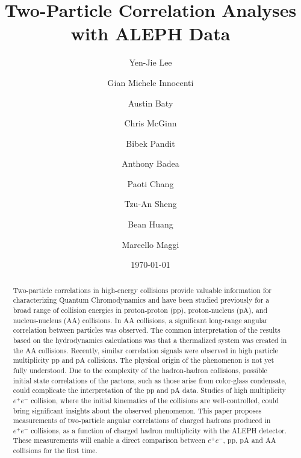 \documentclass[aps,prl,twocolumn,showpacs,superscriptaddress,groupedaddress]{revtex4}  %
\begin{document}
\widetext
{}

\title{Two-Particle Correlation Analyses with ALEPH Data}
\author{Yen-Jie Lee}
\author{Gian Michele Innocenti}
\author{Austin Baty}
\author{Chris McGinn}
\author{Bibek Pandit}
\author{Anthony Badea}
%
\author{Paoti Chang}
\author{Tzu-An Sheng}
\author{Bean Huang}
%
\author{Marcello Maggi}
%
\date{\today}


\begin{abstract}
Two-particle correlations in high-energy collisions provide valuable information for characterizing Quantum Chromodynamics and have been studied previously for a broad range of collision energies in proton-proton (pp), proton-nucleus (pA), and nucleus-nucleus (AA) collisions. In AA collisions, a significant long-range angular correlation between particles was observed. The common interpretation of the results based on the hydrodynamics calculations was that a thermalized system was created in the AA collisions. Recently, similar correlation signals were observed in high particle multiplicity pp and pA collisions. The physical origin of the phenomenon is not yet fully understood. Due to the complexity of the hadron-hadron collisions, possible initial state correlations of the partons, such as those arise from color-glass condensate, could complicate the interpretation of the pp and pA data. Studies of high multiplicity $e^+e^-$ collision, where the initial kinematics of the collisions are well-controlled, could bring significant insights about the observed phenomenon. This paper proposes measurements of two-particle angular correlations of charged hadrons produced in $e^+e^-$ collisions, as a function of charged hadron multiplicity with the ALEPH detector. These measurements will enable a direct comparison between $e^+e^-$, pp, pA and AA collisions for the first time.
\end{abstract}

\pacs{}
\maketitle
\end{document}
